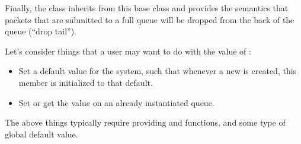 \documentclass[letterpaper,10pt,english]{sphinxmanual}
\renewcommand{\sphinxcode}[1]{\texttt{\small{#1}}}
\begin{document}
\begin{sphinxVerbatim}[commandchars=\\\{\}]
 
       
         

 
    
        
\end{sphinxVerbatim}

Finally, the class \sphinxcode{} inherits from this base
class and provides the semantics that packets that are submitted to
a full queue will be dropped from the back of the queue (“drop tail”).

\begin{sphinxVerbatim}[commandchars=\\\{\}]
  
    
\end{sphinxVerbatim}

Let’s consider things that a user may want to do with the value of
\sphinxcode{}:
\begin{itemize}
\item {} 
Set a default value for the system, such that whenever a new
\sphinxcode{} is created, this member is initialized
to that default.

\item {} 
Set or get the value on an already instantiated queue.

\end{itemize}

The above things typically require providing \sphinxcode{} and \sphinxcode{}
functions, and some type of global default value.
\end{document}
